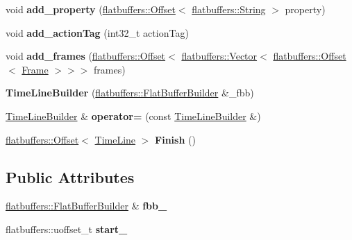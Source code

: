 \begin{DoxyCompactItemize}
\mbox{\label{structflatbuffers_1_1TimeLineBuilder_a74518df34b793a8de3f843ea54853b0a}} 
void {\bfseries add\+\_\+property} (\hyperlink{structflatbuffers_1_1Offset}{flatbuffers\+::\+Offset}$<$ \hyperlink{structflatbuffers_1_1String}{flatbuffers\+::\+String} $>$ property)
\item 
\mbox{\label{structflatbuffers_1_1TimeLineBuilder_a75d9917fbcc018ecc9ed731b9d4cf460}} 
void {\bfseries add\+\_\+action\+Tag} (int32\+\_\+t action\+Tag)
\item 
\mbox{\label{structflatbuffers_1_1TimeLineBuilder_a66db3b559cfe477d0bb61375aa49ee50}} 
void {\bfseries add\+\_\+frames} (\hyperlink{structflatbuffers_1_1Offset}{flatbuffers\+::\+Offset}$<$ \hyperlink{classflatbuffers_1_1Vector}{flatbuffers\+::\+Vector}$<$ \hyperlink{structflatbuffers_1_1Offset}{flatbuffers\+::\+Offset}$<$ \hyperlink{structflatbuffers_1_1Frame}{Frame} $>$$>$$>$ frames)
\item 
\mbox{\label{structflatbuffers_1_1TimeLineBuilder_ab8be89ffca1582addcc4e490d389230e}} 
{\bfseries Time\+Line\+Builder} (\hyperlink{classflatbuffers_1_1FlatBufferBuilder}{flatbuffers\+::\+Flat\+Buffer\+Builder} \&\+\_\+fbb)
\item 
\mbox{\label{structflatbuffers_1_1TimeLineBuilder_abde72ba7da6b7bd59587f1ef6efdb628}} 
\hyperlink{structflatbuffers_1_1TimeLineBuilder}{Time\+Line\+Builder} \& {\bfseries operator=} (const \hyperlink{structflatbuffers_1_1TimeLineBuilder}{Time\+Line\+Builder} \&)
\item 
\mbox{\label{structflatbuffers_1_1TimeLineBuilder_a85cff8ec8fcb03af22e418a146151faf}} 
\hyperlink{structflatbuffers_1_1Offset}{flatbuffers\+::\+Offset}$<$ \hyperlink{structflatbuffers_1_1TimeLine}{Time\+Line} $>$ {\bfseries Finish} ()
\end{DoxyCompactItemize}
\subsection*{Public Attributes}
\begin{DoxyCompactItemize}
\item 
\mbox{\label{structflatbuffers_1_1TimeLineBuilder_a991f6d99e8bcf290d872c173485a8563}} 
\hyperlink{classflatbuffers_1_1FlatBufferBuilder}{flatbuffers\+::\+Flat\+Buffer\+Builder} \& {\bfseries fbb\+\_\+}
\item 
\mbox{\label{structflatbuffers_1_1TimeLineBuilder_a6eeacfa0685402e105b2151650a7f8ff}} 
flatbuffers\+::uoffset\+\_\+t {\bfseries start\+\_\+}
\end{DoxyCompactItemize}


